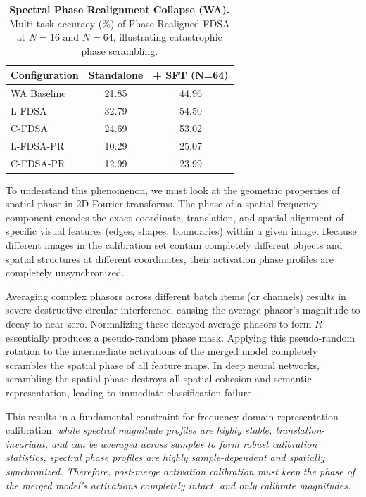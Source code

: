 \documentclass{article}
\begin{document}
\begin{table}[h]
\caption{\textbf{Spectral Phase Realignment Collapse (WA).} Multi-task accuracy (\%) of Phase-Realigned FDSA at $N=16$ and $N=64$, illustrating catastrophic phase scrambling.}
\label{tab:phase_collapse}
\vskip 0.15in
\begin{center}
\begin{small}
\begin{sc}
\begin{tabular}{lcc}
\toprule
Configuration & Standalone & + SFT (N=64) \\
\midrule
WA Baseline & 21.85 & 44.96 \\
\midrule
L-FDSA & 32.79 & 54.50 \\
C-FDSA & 24.69 & 53.02 \\
\midrule
L-FDSA-PR & 10.29 & 25.07 \\
C-FDSA-PR & 12.99 & 23.99 \\
\bottomrule
\end{tabular}
\end{sc}
\end{small}
\end{center}
\vskip -0.1in
\end{table}

To understand this phenomenon, we must look at the geometric properties of spatial phase in 2D Fourier transforms. The phase of a spatial frequency component encodes the exact coordinate, translation, and spatial alignment of specific visual features (edges, shapes, boundaries) within a given image. Because different images in the calibration set contain completely different objects and spatial structures at different coordinates, their activation phase profiles are completely unsynchronized. 

Averaging complex phasors across different batch items (or channels) results in severe destructive circular interference, causing the average phasor's magnitude to decay to near zero. Normalizing these decayed average phasors to form $R$ essentially produces a pseudo-random phase mask. Applying this pseudo-random rotation to the intermediate activations of the merged model completely scrambles the spatial phase of all feature maps. In deep neural networks, scrambling the spatial phase destroys all spatial cohesion and semantic representation, leading to immediate classification failure.

This results in a fundamental constraint for frequency-domain representation calibration: \textit{while spectral magnitude profiles are highly stable, translation-invariant, and can be averaged across samples to form robust calibration statistics, spectral phase profiles are highly sample-dependent and spatially synchronized. Therefore, post-merge activation calibration must keep the phase of the merged model's activations completely intact, and only calibrate magnitudes.}
\end{document}
